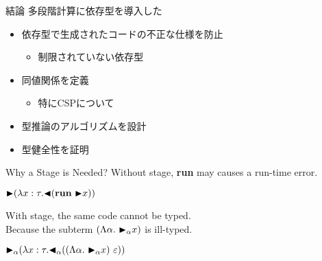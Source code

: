 \documentclass[dvipdfmx,aspectratio=169, 20pt]{beamer}
\begin{document}
\begin{frame}[fragile]{結論}
    多段階計算に依存型を導入した
    \begin{itemize}
        \item 依存型で生成されたコードの不正な仕様を防止
            \begin{itemize}
                \item 制限されていない依存型
            \end{itemize}
        \item 同値関係を定義
            \begin{itemize}
                \item 特にCSPについて
            \end{itemize}
        \item 型推論のアルゴリズムを設計 
        \item 型健全性を証明 
    \end{itemize}
\end{frame}

\begin{frame}[fragile]{Why a Stage is Needed?}
    Without stage, \textbf{run} may causes a run-time error.
    \begin{exampleblock}{}
        \begin{center}
    \( \TB (\lambda x:\tau. \TBL (\textbf{run}\ \TB x)) \)
        \end{center}
    \end{exampleblock}

    With stage, the same code cannot be typed.\\
    Because the subterm \( (\Lambda\alpha.\ \TB_\alpha x) \) is ill-typed.
    \begin{exampleblock}{}
        \begin{center}
    \( {\mathop{\blacktriangleright}}_\alpha (\lambda x:\tau. {\mathop{\blacktriangleleft}}_\alpha ((\Lambda\alpha.\ {\mathop{\blacktriangleright}}_\alpha x)\ \varepsilon)) \)
        \end{center}
    \end{exampleblock}
\end{frame}
\end{document}
